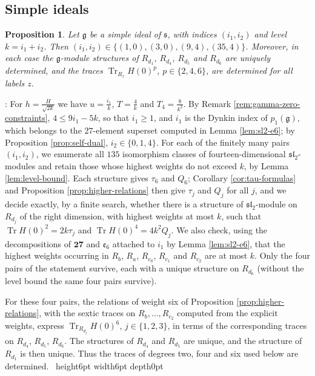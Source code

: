 \documentclass[leqno]{article}
\renewcommand{\leq}{\ensuremath{\leqslant}}
\renewcommand{\geq}{\ensuremath{\geqslant}}
\newcommand{\qed}{\hfill \vrule height6pt  width6pt depth0pt}
\newtheorem{prop}[thm]{Proposition}
\newenvironment{proof}[1][]{\noindent {\it Proof #1} : }{\hbox{~}\qed
\smallskip
}
\numberwithin{equation}{section}
\begin{document}
\subsection{Simple ideals}

\begin{prop}
\label{prop:simple-ideals-gamma0}
Let $\mathfrak g$ be a simple ideal of $\mathfrak s$, with indices $(i_1,i_2)$ and level $k = i_1+i_2$. Then $(i_1,i_2) \in \{(1,0),(3,0),(9,4),(35,4)\}$. Moreover, in each case the $\mathfrak g$-module structures of $R_{d_1}$, $R_{d_4}$, $R_{d_5}$ and $R_{d_6}$ are uniquely determined, and the traces $\operatorname{Tr}_{R_z}H(0)^p$, $p \in \{2,4,6\}$, are determined for all labels $z$.
\end{prop}

\begin{proof}
For $h = \frac{H}{\sqrt{2k}}$ we have $u = \frac{i_1}{k}$, $T = \frac{4}{k}$ and $T_4 = \frac{8}{k^2}$. By Remark \ref{rem:gamma-zero-constraints}, $4 \leq 9i_1-5k$, so that $i_1 \geq 1$, and $i_1$ is the Dynkin index of $p_1(\mathfrak g)$, which belongs to the $27$-element superset computed in Lemma \ref{lem:sl2-e6}; by Proposition \ref{prop:self-dual}, $i_2 \in \{0,1,4\}$. For each of the finitely many pairs $(i_1,i_2)$, we enumerate all $135$ isomorphism classes of fourteen-dimensional $\mathfrak{sl}_2$-modules and retain those whose highest weights do not exceed $k$, by Lemma \ref{lem:level-bound}. Each structure gives $\tau_6$ and $Q_6$; Corollary \ref{cor:tau-formulas} and Proposition \ref{prop:higher-relations} then give $\tau_j$ and $Q_j$ for all $j$, and we decide exactly, by a finite search, whether there is a structure of $\mathfrak{sl}_2$-module on $R_{d_j}$ of the right dimension, with highest weights at most $k$, such that $\operatorname{Tr}H(0)^2 = 2k\tau_j$ and $\operatorname{Tr}H(0)^4 = 4k^2Q_j$. We also check, using the decompositions of $\mathbf{27}$ and $\mathfrak e_6$ attached to $i_1$ by Lemma \ref{lem:sl2-e6}, that the highest weights occurring in $R_b$, $R_a$, $R_{c_0}$, $R_{c_1}$ and $R_{c_2}$ are at most $k$. Only the four pairs of the statement survive, each with a unique structure on $R_{d_6}$ (without the level bound the same four pairs survive).

For these four pairs, the relations of weight six of Proposition \ref{prop:higher-relations}, with the sextic traces on $R_b,\ldots,R_{c_2}$ computed from the explicit weights, express $\operatorname{Tr}_{R_{d_j}}H(0)^6$, $j \in \{1,2,3\}$, in terms of the corresponding traces on $R_{d_4}$, $R_{d_5}$, $R_{d_6}$. The structures of $R_{d_4}$ and $R_{d_5}$ are unique, and the structure of $R_{d_1}$ is then unique. Thus the traces of degrees two, four and six used below are determined.
\end{proof}
\end{document}
